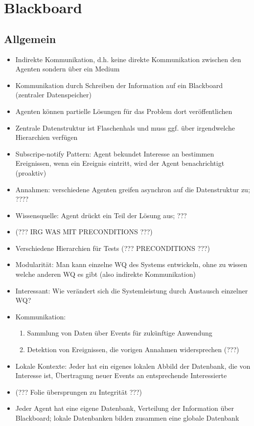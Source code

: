 \documentclass{article} %
\begin{document}
	\section{Blackboard}
	\subsection{Allgemein}
	\begin{itemize}
		\item Indirekte Kommunikation, d.h. keine direkte Kommunikation zwischen den Agenten sondern über ein Medium
		\item Kommunikation durch Schreiben der Information auf ein Blackboard (zentraler Datenspeicher)
		\item Agenten können partielle Lösungen für das Problem dort veröffentlichen
		\item Zentrale Datenstruktur ist Flaschenhals und muss ggf. über irgendwelche Hierarchien verfügen
		\item Subscripe-notify Pattern: Agent bekundet Interesse an  bestimmen Ereignissen, wenn ein Ereignis eintritt, wird der Agent benachrichtigt (proaktiv)
		\item Annahmen: verschiedene Agenten greifen asynchron auf die Datenstruktur zu; ????
		\item Wissensquelle: Agent drückt ein Teil der Lösung aus; ???
		\item (??? IRG WAS MIT PRECONDITIONS ???)
		\item Verschiedene Hierarchien für Tests (??? PRECONDITIONS ???)
		\item Modularität: Man kann einzelne WQ des Systems entwickeln, ohne zu wissen welche anderen WQ es gibt (also indirekte Kommunikation)
		\item Interessant: Wie verändert sich die Systemleistung durch Austausch einzelner WQ?
		\item Kommunikation:
		\begin{enumerate}
			\item Sammlung von Daten über Events für zukünftige Anwendung
			\item Detektion von Ereignissen, die vorigen Annahmen widersprechen (???)
		\end{enumerate}
		\item Lokale Kontexte: Jeder hat ein eigenes lokalen Abbild der Datenbank, die von Interesse ist, Übertragung neuer Events an entsprechende Interessierte
		\item (??? Folie übersprungen zu Integrität ???)
		\item Jeder Agent hat eine eigene Datenbank, Verteilung der Information über Blackboard; lokale Datenbanken bilden zusammen eine globale Datenbank
	\end{itemize}
\end{document}
